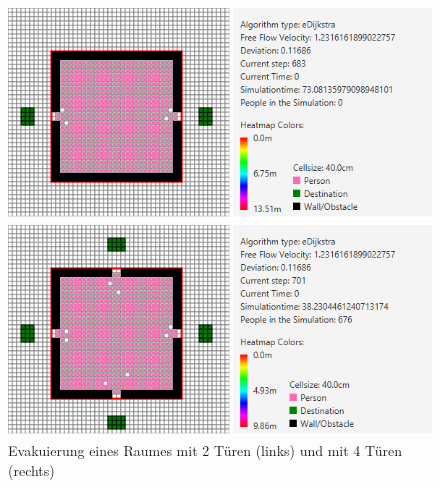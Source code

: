 \begin{figure}[!htb]
	\centering
	\begin{minipage}{.5\textwidth}
		\centering
		\includegraphics[width=\textwidth]{abbildungen/Evak2TuerenAnfang.png}
		
	\end{minipage}%
	\begin{minipage}{0.5\textwidth}
		\centering
		\includegraphics[width=\textwidth]{abbildungen/Evak4TuerenAnfang.png}
	\end{minipage}
	\caption{Evakuierung eines Raumes mit 2 Türen (links) und mit 4 Türen (rechts)}
	\label{fig:Eva2T4TMap}
\end{figure}

